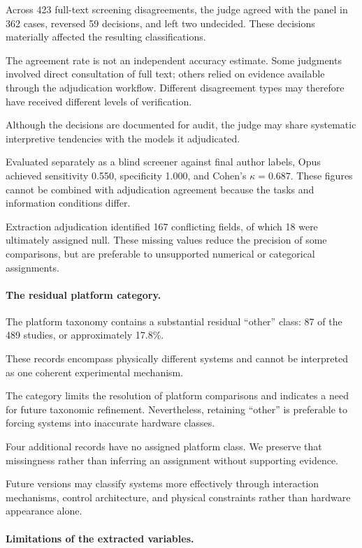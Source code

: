 Across 423 full-text screening
disagreements, the judge agreed
with the panel in 362 cases,
reversed 59 decisions, and
left two undecided. These
decisions materially affected
the resulting classifications.

The agreement rate is not an
independent accuracy estimate.
Some judgments involved direct
consultation of full text;
others relied on evidence
available through the
adjudication workflow.
Different disagreement types
may therefore have received
different levels of verification.

Although the decisions are
documented for audit,
the judge may share systematic
interpretive tendencies with
the models it adjudicated.

Evaluated separately as a
blind screener against final
author labels, Opus achieved
sensitivity 0.550,
specificity 1.000, and
Cohen's $\kappa=0.687$.
These figures cannot be
combined with adjudication
agreement because the tasks
and information conditions differ.

Extraction adjudication identified
167 conflicting fields, of which
18 were ultimately assigned null.
These missing values reduce the
precision of some comparisons,
but are preferable to unsupported
numerical or categorical assignments.

\paragraph*{The residual platform category.}

The platform taxonomy contains
a substantial residual ``other''
class: 87 of the 489 studies,
or approximately 17.8\%.

These records encompass physically
different systems and cannot be
interpreted as one coherent
experimental mechanism.

The category limits the resolution
of platform comparisons and indicates
a need for future taxonomic refinement.
Nevertheless, retaining ``other''
is preferable to forcing systems
into inaccurate hardware classes.

Four additional records have no
assigned platform class. We preserve
that missingness rather than inferring
an assignment without supporting evidence.

Future versions may classify systems
more effectively through interaction
mechanisms, control architecture,
and physical constraints rather
than hardware appearance alone.

\paragraph*{Limitations of the extracted variables.}

